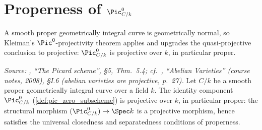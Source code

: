\section{Properness of \(\Pic^0_{C/k}\)}
\label{sec:pic0_proper}

A smooth proper geometrically integral curve is geometrically normal,
so Kleiman's \(\Pic^0\)-projectivity theorem applies and upgrades the
quasi-projective conclusion to projective: \(\Pic^0_{C/k}\) is
projective over \(k\), in particular proper.

\begin{theorem}
  \label{thm:pic0_proper}

  \textit{Source: \cite{kleiman-picard}, ``The Picard scheme'', \S 5,
  Thm.~5.4; cf.\ \cite{milne-av}, ``Abelian Varieties'' (course notes,
  2008), \S I.6 (abelian varieties are projective, p.~27).}
  Let \(C/k\) be a smooth proper geometrically integral curve over a
  field \(k\). The identity component \(\Pic^0_{C/k}\)
  (\cref{def:pic_zero_subscheme}) is projective over \(k\), in
  particular proper: the structural morphism
  \((\Pic^0_{C/k}) \to \Spec k\) is a projective morphism, hence
  satisfies the universal closedness and separatedness conditions of
  properness.
\end{theorem}

